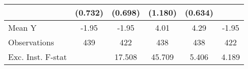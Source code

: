 {\begin{tabular}{l*{5}{c}}
            &     (0.732)         &     (0.698)         &     (1.180)         &     (0.634)         &                     \\
\midrule
Mean Y      &       -1.95         &       -1.95         &        4.01         &        4.29         &       -1.95         \\
Observations&         439         &         422         &         438         &         438         &         422         \\
Exc. Inst. F-stat&                     &      17.508         &      45.709         &       5.406         &       4.189         \\
\bottomrule
\end{tabular}
}
